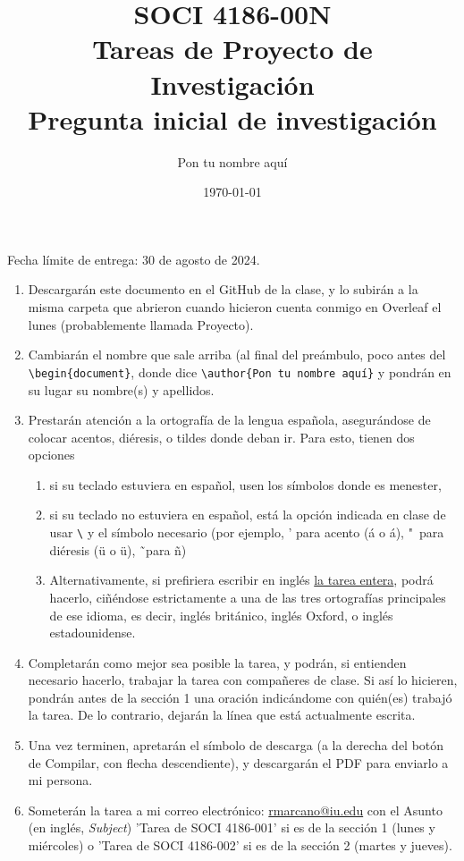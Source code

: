 \documentclass[11pt]{article}
\title{SOCI 4186-00N\\ Tareas de Proyecto de Investigación \textnumero 1 \\ Pregunta inicial de investigación}
\author{Pon tu nombre aquí}
\date{\today}
\begin{document}
\singlespacing
\maketitle
\onehalfspacing
Fecha límite de entrega: 30 de agosto de 2024.

\begin{enumerate}
    \item Descargarán este documento en el GitHub de la clase, y lo subirán a la misma carpeta que abrieron cuando hicieron cuenta conmigo en Overleaf el lunes (probablemente llamada Proyecto).
    \item Cambiarán el nombre que sale arriba (al final del preámbulo, poco antes del \texttt{\textbackslash begin\{document\}}, donde dice \texttt{\textbackslash author\{Pon tu nombre aquí\}} y pondrán en su lugar su nombre(s) y apellidos.
    \item Prestarán atención a la ortografía de la lengua española, asegurándose de colocar acentos, diéresis, o tildes donde deban ir. Para esto, tienen dos opciones 
    \begin{enumerate}
        \item si su teclado estuviera en español, usen los símbolos donde es menester,
        \item si su teclado no estuviera en español, está la opción indicada en clase de usar \texttt{\textbackslash} y el símbolo necesario (por ejemplo, ' para acento (\'a o \'{a}), "\ para diéresis (\"u o \"{u}), \~\ para \~n)
        \item Alternativamente, si prefiriera escribir en inglés \underline{la tarea entera}, podrá hacerlo, ciñéndose estrictamente a una de las tres ortografías principales de ese idioma, es decir, inglés británico, inglés Oxford, o inglés estadounidense.
    \end{enumerate}
    \item Completarán como mejor sea posible la tarea, y podrán, si entienden necesario hacerlo, trabajar la tarea con compañeres de clase. Si así lo hicieren, pondrán antes de la sección 1 una oración indicándome con quién(es) trabajó la tarea. De lo contrario, dejarán la línea que está actualmente escrita.
    \item  Una vez terminen, apretarán el símbolo de descarga (a la derecha del botón de Compilar, con flecha descendiente), y descargarán el PDF para enviarlo a mi persona.
    \item Someterán la tarea a mi correo electrónico: \href{mailto:rmarcano@iu.edu}{rmarcano@iu.edu} con el Asunto (en inglés, \textit{Subject}) 'Tarea de SOCI 4186-001' si es de la sección 1 (lunes y miércoles) o 'Tarea de SOCI 4186-002' si es de la sección 2 (martes y jueves).
\end{enumerate}
\end{document}
